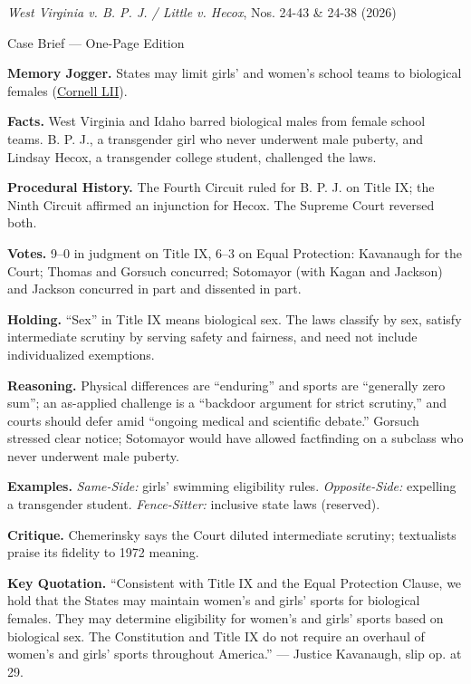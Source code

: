 \documentclass[12pt]{article}
\begin{document}
\begin{center}
{\Large \textit{West Virginia v. B. P. J. / Little v. Hecox}, Nos. 24-43 \& 24-38 (2026)\par}
\vspace{0.3em}
{\normalsize Case Brief --- One-Page Edition\par}
\end{center}

\textbf{Memory Jogger.} States may limit girls' and women's school teams to biological females (\href{https://www.law.cornell.edu/supremecourt/text/24-43}{Cornell LII}).

\textbf{Facts.} West Virginia and Idaho barred biological males from female school teams. B. P. J., a transgender girl who never underwent male puberty, and Lindsay Hecox, a transgender college student, challenged the laws.

\textbf{Procedural History.} The Fourth Circuit ruled for B. P. J. on Title IX; the Ninth Circuit affirmed an injunction for Hecox. The Supreme Court reversed both.

\textbf{Votes.} 9--0 in judgment on Title IX, 6--3 on Equal Protection: Kavanaugh for the Court; Thomas and Gorsuch concurred; Sotomayor (with Kagan and Jackson) and Jackson concurred in part and dissented in part.

\textbf{Holding.} ``Sex'' in Title IX means biological sex. The laws classify by sex, satisfy intermediate scrutiny by serving safety and fairness, and need not include individualized exemptions.

\textbf{Reasoning.} Physical differences are ``enduring'' and sports are ``generally zero sum''; an as-applied challenge is a ``backdoor argument for strict scrutiny,'' and courts should defer amid ``ongoing medical and scientific debate.'' Gorsuch stressed clear notice; Sotomayor would have allowed factfinding on a subclass who never underwent male puberty.

\textbf{Examples.} \emph{Same-Side:} girls' swimming eligibility rules. \emph{Opposite-Side:} expelling a transgender student. \emph{Fence-Sitter:} inclusive state laws (reserved).

\textbf{Critique.} Chemerinsky says the Court diluted intermediate scrutiny; textualists praise its fidelity to 1972 meaning.

\textbf{Key Quotation.} ``Consistent with Title IX and the Equal Protection Clause, we hold that the States may maintain women's and girls' sports for biological females. They may determine eligibility for women's and girls' sports based on biological sex. The Constitution and Title IX do not require an overhaul of women's and girls' sports throughout America.'' --- Justice Kavanaugh, slip op. at 29.
\end{document}
